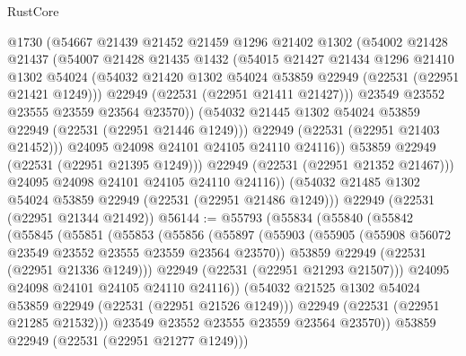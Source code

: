 \begin{lexlean}{RustCore}
\begin{coremodule}
                @1730
                (@54667
                  @21439
                  @21452
                  @21459
                  @1296
                  @21402
                  @1302
                  (@54002
                    @21428
                    @21437
                    (@54007
                      @21428
                      @21435
                      @1432
                      (@54015
                        @21427
                        @21434
                        @1296
                        @21410
                        @1302
                        @54024
                        (@54032 @21420 @1302 @54024 @53859 @22949 (@22531 (@22951 @21421 @1249)))
                        @22949
                        (@22531 (@22951 @21411 @21427)))
                      @23549
                      @23552
                      @23555
                      @23559
                      @23564
                      @23570))
                  (@54032 @21445 @1302 @54024 @53859 @22949 (@22531 (@22951 @21446 @1249)))
                  @22949
                  (@22531 (@22951 @21403 @21452)))
                @24095
                @24098
                @24101
                @24105
                @24110
                @24116))
            @53859
            @22949
            (@22531 (@22951 @21395 @1249)))
          @22949
          (@22531 (@22951 @21352 @21467)))
        @24095
        @24098
        @24101
        @24105
        @24110
        @24116))
    (@54032 @21485 @1302 @54024 @53859 @22949 (@22531 (@22951 @21486 @1249)))
    @22949
    (@22531 (@22951 @21344 @21492))
@56144 := @55793
    (@55834
      (@55840
        (@55842
          (@55845
            (@55851
              (@55853
                (@55856
                  (@55897
                    (@55903
                      (@55905 (@55908 @56072 @23549 @23552 @23555 @23559 @23564 @23570))
                      @53859
                      @22949
                      (@22531 (@22951 @21336 @1249)))
                    @22949
                    (@22531 (@22951 @21293 @21507)))
                  @24095
                  @24098
                  @24101
                  @24105
                  @24110
                  @24116))
              (@54032 @21525 @1302 @54024 @53859 @22949 (@22531 (@22951 @21526 @1249)))
              @22949
              (@22531 (@22951 @21285 @21532)))
            @23549
            @23552
            @23555
            @23559
            @23564
            @23570))
        @53859
        @22949
        (@22531 (@22951 @21277 @1249)))

\end{coremodule}
\end{lexlean}
